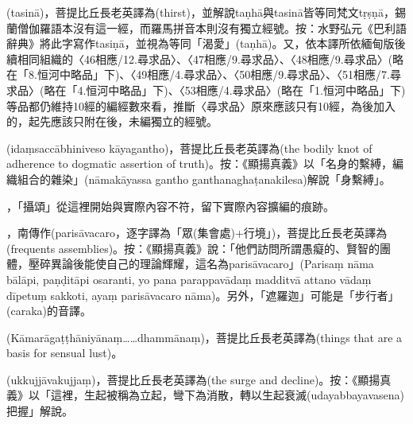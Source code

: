 \startitemgroup[noteitems]
\item{}(tasinā)，菩提比丘長老英譯為(thirst)，並解說taṇhā與tasinā皆等同梵文tṛṣṇā，錫蘭僧伽羅語本沒有這一經，而羅馬拼音本則沒有獨立經號。按：水野弘元《巴利語辭典》將此字寫作tasiṇā，並視為等同「渴愛」(taṇhā)。又，依本譯所依緬甸版後續相同組織的〈46相應/12.尋求品〉、〈47相應/9.尋求品〉、〈48相應/9.尋求品〉(略在「8.恒河中略品」下)、〈49相應/4.尋求品〉、〈50相應/9.尋求品〉、〈51相應/7.尋求品〉(略在「4.恒河中略品」下)、〈53相應/4.尋求品〉(略在「1.恒河中略品」下)等品都仍維持10經的編經數來看，推斷〈尋求品〉原來應該只有10經，為後加入的，起先應該只附在後，未編獨立的經號。
\stopitemgroup

\startitemgroup[noteitems]
\item{}(idaṃsaccābhiniveso kāyagantho)，菩提比丘長老英譯為(the bodily knot of adherence to dogmatic assertion of truth)。按：《顯揚真義》以「名身的繫縛，編織組合的雜染」(nāmakāyassa gantho ganthanaghaṭanakilesa)解說「身繫縛」。
\stopitemgroup

\startitemgroup[noteitems]
\item{}，「攝頌」從這裡開始與實際內容不符，留下實際內容擴編的痕跡。
\stopitemgroup

\startitemgroup[noteitems]
\item{}，南傳作(parisāvacaro，逐字譯為「眾(集會處)+行境」)，菩提比丘長老英譯為(frequents assemblies)。按：《顯揚真義》說：「他們訪問所謂愚癡的、賢智的團體，壓碎異論後能使自己的理論輝耀，這名為parisāvacaro」(Parisaṃ nāma bālāpi, paṇḍitāpi osaranti, yo pana parappavādaṃ madditvā attano vādaṃ dīpetuṃ sakkoti, ayaṃ parisāvacaro nāma)。另外，「遮羅迦」可能是「步行者」(caraka)的音譯。
\stopitemgroup

\startitemgroup[noteitems]
\item{}(Kāmarāgaṭṭhāniyānaṃ……dhammānaṃ)，菩提比丘長老英譯為(things that are a basis for sensual lust)。
\stopitemgroup

\startitemgroup[noteitems]
\item{}(ukkujjāvakujjaṃ)，菩提比丘長老英譯為(the surge and decline)。按：《顯揚真義》以「這裡，生起被稱為立起，彎下為消散，轉以生起衰滅(udayabbayavasena)把握」解說。
\stopitemgroup

